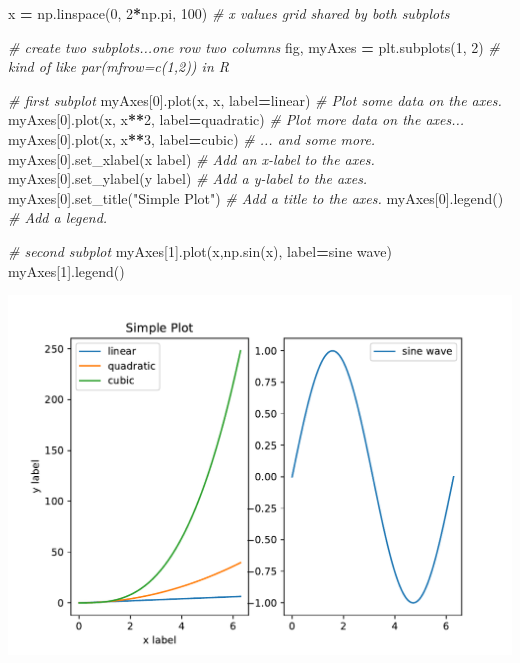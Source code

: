 \documentclass[
  12pt,
]{krantz}
\makeatletter
\newenvironment{Shaded}{\begin{snugshade}}{\end{snugshade}}
\newcommand{\CommentTok}[1]{\textcolor[rgb]{0.37,0.37,0.37}{\textit{#1}}}
\newcommand{\DecValTok}[1]{\textcolor[rgb]{0.06,0.06,0.06}{#1}}
\newcommand{\NormalTok}[1]{#1}
\newcommand{\OperatorTok}[1]{\textcolor[rgb]{0.43,0.43,0.43}{\textbf{#1}}}
\newcommand{\StringTok}[1]{\textcolor[rgb]{0.5,0.5,0.5}{#1}}
\newenvironment{kframe}{%
\medskip{}
\setlength{\fboxsep}{.8em}
 \def\at@end@of@kframe{}%
 \ifinner\ifhmode%
  \def\at@end@of@kframe{\end{minipage}}%
  \begin{minipage}{\columnwidth}%
 \fi\fi%
 \def\FrameCommand##1{\hskip\@totalleftmargin \hskip-\fboxsep
 \colorbox{shadecolor}{##1}\hskip-\fboxsep
     \hskip-\linewidth \hskip-\@totalleftmargin \hskip\columnwidth}%
 \MakeFramed {\advance\hsize-\width
   \@totalleftmargin\z@ \linewidth\hsize
   \@setminipage}}%
 {\par\unskip\endMakeFramed%
 \at@end@of@kframe}
\renewenvironment{Shaded}{\begin{kframe}}{\end{kframe}}
\makeatother
\begin{document}
\begin{Shaded}
\begin{Highlighting}[]
\NormalTok{x }\OperatorTok{=}\NormalTok{ np.linspace(}\DecValTok{0}\NormalTok{, }\DecValTok{2}\OperatorTok{*}\NormalTok{np.pi, }\DecValTok{100}\NormalTok{) }\CommentTok{\# x values grid shared by both subplots}

\CommentTok{\# create two subplots...one row two columns}
\NormalTok{fig, myAxes }\OperatorTok{=}\NormalTok{ plt.subplots(}\DecValTok{1}\NormalTok{, }\DecValTok{2}\NormalTok{) }\CommentTok{\# kind of like par(mfrow=c(1,2)) in R}

\CommentTok{\# first subplot}
\NormalTok{myAxes[}\DecValTok{0}\NormalTok{].plot(x, x, label}\OperatorTok{=}\StringTok{\textquotesingle{}linear\textquotesingle{}}\NormalTok{)  }\CommentTok{\# Plot some data on the axes.}
\NormalTok{myAxes[}\DecValTok{0}\NormalTok{].plot(x, x}\OperatorTok{**}\DecValTok{2}\NormalTok{, label}\OperatorTok{=}\StringTok{\textquotesingle{}quadratic\textquotesingle{}}\NormalTok{)  }\CommentTok{\# Plot more data on the axes...}
\NormalTok{myAxes[}\DecValTok{0}\NormalTok{].plot(x, x}\OperatorTok{**}\DecValTok{3}\NormalTok{, label}\OperatorTok{=}\StringTok{\textquotesingle{}cubic\textquotesingle{}}\NormalTok{)  }\CommentTok{\# ... and some more.}
\NormalTok{myAxes[}\DecValTok{0}\NormalTok{].set\_xlabel(}\StringTok{\textquotesingle{}x label\textquotesingle{}}\NormalTok{)  }\CommentTok{\# Add an x{-}label to the axes.}
\NormalTok{myAxes[}\DecValTok{0}\NormalTok{].set\_ylabel(}\StringTok{\textquotesingle{}y label\textquotesingle{}}\NormalTok{)  }\CommentTok{\# Add a y{-}label to the axes.}
\NormalTok{myAxes[}\DecValTok{0}\NormalTok{].set\_title(}\StringTok{"Simple Plot"}\NormalTok{)  }\CommentTok{\# Add a title to the axes.}
\NormalTok{myAxes[}\DecValTok{0}\NormalTok{].legend()  }\CommentTok{\# Add a legend.}

\CommentTok{\# second subplot}
\NormalTok{myAxes[}\DecValTok{1}\NormalTok{].plot(x,np.sin(x), label}\OperatorTok{=}\StringTok{\textquotesingle{}sine wave\textquotesingle{}}\NormalTok{)}
\NormalTok{myAxes[}\DecValTok{1}\NormalTok{].legend()}
\end{Highlighting}
\end{Shaded}

\includegraphics{r_and_python_book_files/figure-latex/unnamed-chunk-178-3.pdf}
\end{document}
